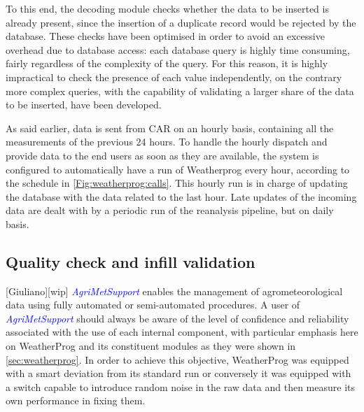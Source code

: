 \documentclass[authoryear,preprint,review,12pt]{elsarticle}
\newcommand{\update}[1]{\emph{\textcolor{blue}{#1}}}
\newcommand{\gci}{\update{AgriMetSupport}\xspace}
\begin{document}
 To this end, the decoding module checks whether the data to be inserted is already present, since the insertion of a duplicate record would be rejected by the database. These checks have been optimised in order to avoid an excessive overhead due to database access: each database query is highly time consuming, fairly regardless of the complexity of the query. For this reason, it is highly impractical to check the presence of each value independently, on the contrary more complex queries, with the capability of validating a larger share of the data to be inserted, have been developed.
 
As said earlier, data is sent from CAR on an hourly basis, containing all the measurements of the previous 24 hours.
To handle the hourly dispatch and provide data to the end users as soon as they are available, the system is configured to automatically have a run of Weatherprog every hour, according to the schedule in \cref{Fig:weatherprog:calls}.
This hourly run is in charge of updating the database with the data related to the last hour.
Late updates of the incoming data are dealt with by a periodic run of the reanalysis pipeline, but on daily basis.


\subsection{Quality check and infill validation}[Giuliano][wip] \label{QcheckValidation}
\gci enables the management of agrometeorological data using fully automated or semi-automated procedures. %
A user of \gci should always be aware of the level of confidence and reliability associated with the use of each internal component, with particular emphasis here on WeatherProg and its constituent modules as they were shown in \cref{sec:weatherprog}. 
In order to achieve this objective, WeatherProg was equipped with a smart deviation from its standard run or conversely it was equipped with a switch capable to introduce random noise in the raw data and then measure its own performance in fixing them. %
\end{document}
